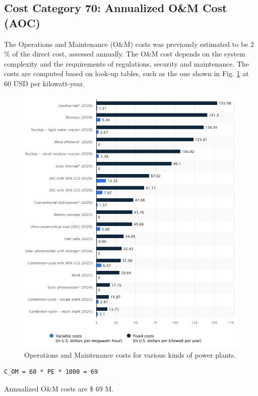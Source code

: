 \subsection{Cost Category 70: Annualized O\&M Cost (AOC)}

The Operations and Maintenance (O\&M) costs was previously estimated to be 2 \% of the direct cost, assessed annually.  The O\&M cost depends on the system complexity and the requirements of regulations, security and maintenance. The costs are computed based on look-up tables, such as the one shown in Fig. \ref{fig:statista} at 60 USD per kilowatt-year.  

\begin{figure}[b!] 
\centering 
\includegraphics[scale=0.5]{StandardFigures/statista.png} 
\caption{Operations and Maintenance costs for various kinds of power plants.} 
\label{fig:statista} 
\end{figure} 

\begin{verbatim} 
C_OM = 60 * PE * 1000 = 69  
\end{verbatim} 

Annualized O\&M costs are \$ 69 M.

